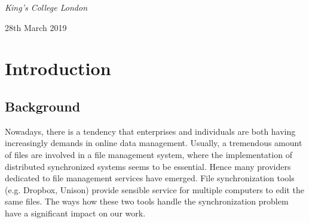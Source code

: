 \documentclass[a4paper,11pt]{article}
\begin{document}
\begin{titlepage}
	\vspace{0.5\baselineskip} %
	
	\textit{King's College London} %
	
	\vfill %
	
	
	
	\vspace{0.3\baselineskip} %
	
	28th March 2019%
	

\end{titlepage}


\newpage
\tableofcontents
\newpage

\noindent 
\section{Introduction}
\subsection{Background} Nowadays, there is a tendency that enterprises and individuals are both having increasingly demands in online data management. Usually, a tremendous amount of files are involved in a file management system, where the implementation of distributed synchronized systems seems to be essential. Hence many providers dedicated to file management services have emerged. File synchronization tools (e.g. Dropbox, Unison) provide sensible service for multiple computers to edit the same files. The ways how these two tools handle the synchronization problem have a significant impact on our work.
\end{document}
